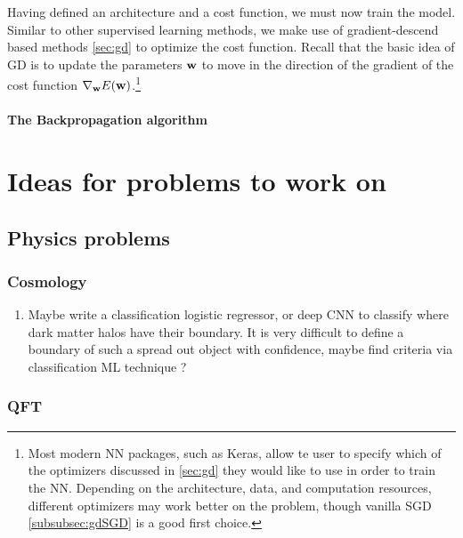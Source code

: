 Having defined an architecture and a cost function, we must now train the model. Similar to other supervised learning methods, we make use of gradient-descend based methods \ref{sec:gd} to optimize the cost function. Recall that the basic idea of GD is to update the parameters $\textbf{w}$ to move in the direction of the gradient of the cost function $\nabla_{\textbf{w}} E(\textbf{w})$.\footnote{Most modern NN packages, such as Keras, allow te user to specify which of the optimizers discussed in \ref{sec:gd} they would like to use in order to train the NN. Depending on the architecture, data, and computation resources, different optimizers may work better on the problem, though vanilla SGD \ref{subsubsec:gdSGD} is a good first choice.}

\subsubsection{The Backpropagation algorithm}
\label{subsubsec:deepBackpropagation}








\chapter{Ideas for problems to work on}
\section{Physics problems}
\subsection{Cosmology}
\begin{enumerate}
	\item Maybe write a classification logistic regressor, or deep CNN to classify where dark matter halos have their boundary. It is very difficult to define a boundary of such a spread out object with confidence, maybe find criteria via classification ML technique ?
\end{enumerate}
\subsection{QFT}